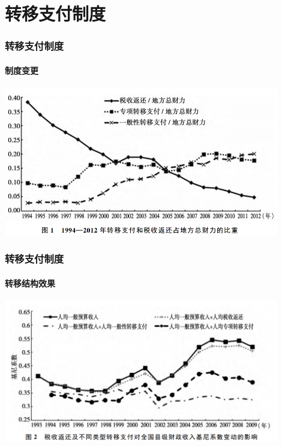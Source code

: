\section{转移支付制度} 


\begin{frame}[t]
\frametitle{转移支付制度}
\framesubtitle{制度变更}
\begin{center}
	\includegraphics[width=0.9\textwidth]{image/n1.png}
\end{center}

\end{frame}


\begin{frame}[t]
	\frametitle{转移支付制度}
	\framesubtitle{转移结构效果}
	\begin{center}
		\includegraphics[width=0.9\textwidth]{image/n2.png}
	\end{center}
	
\end{frame}

